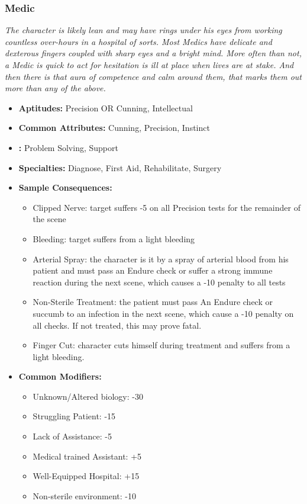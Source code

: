 	\subsubsection{Medic}\label{Medic}
		\textit{The character is likely lean and may have rings under his eyes from working countless over-hours in a hospital of sorts.
		Most Medics have delicate and dexterous fingers coupled with sharp eyes and a bright mind.
		More often than not, a Medic is quick to act for hesitation is ill at place when lives are at stake.
		And then there is that aura of competence and calm around them, that marks them out more than any of the above.}
		\begin{itemize}
			\item \textbf{Aptitudes:} Precision OR Cunning, Intellectual
			\item \textbf{Common Attributes:} Cunning, Precision, Instinct
			\item \textbf{:} Problem Solving, Support
			\item \textbf{Specialties:} Diagnose, First Aid, Rehabilitate, Surgery
			\item \textbf{Sample Consequences:} 
			\begin{itemize}
				\item Clipped Nerve: target suffers -5 on all Precision tests for the remainder of the scene
				\item Bleeding: target suffers from a light bleeding
				\item Arterial Spray: the character is it by a spray of arterial blood from his patient and must pass an Endure check or suffer a strong immune reaction during the next scene, which causes a -10 penalty to all tests
				\item Non-Sterile Treatment: the patient must pass An Endure check or succumb to an infection in the next scene, which cause a -10 penalty on all checks. If not treated, this may prove fatal.
				\item Finger Cut: character cuts himself during treatment and suffers from a light bleeding.
			\end{itemize}
			\item \textbf{Common Modifiers:}
			\begin{itemize}
				\item Unknown/Altered biology: -30
				\item Struggling Patient: -15
				\item Lack of Assistance: -5
				\item Medical trained Assistant: +5
				\item Well-Equipped Hospital: +15
				\item Non-sterile environment: -10
			\end{itemize}
		\end{itemize}

